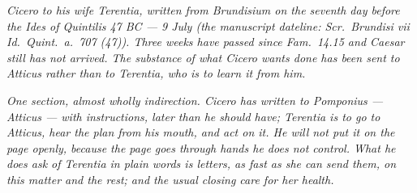 
\textit{Cicero to his wife Terentia, written from
Brundisium on the seventh day before the Ides of
Quintilis 47 BC --- 9 July (the manuscript dateline:
\textit{Scr.\ Brundisi vii Id.\ Quint.\ a.\ 707
(47)}). Three weeks have passed since Fam.\ 14.15 and
Caesar still has not arrived. The substance of what
Cicero wants done has been sent to Atticus rather than
to Terentia, who is to learn it from him.}

\textit{One section, almost wholly indirection. Cicero
has written to Pomponius --- Atticus --- with
instructions, later than he should have; Terentia is
to go to Atticus, hear the plan from his mouth, and
act on it. He will not put it on the page openly,
because the page goes through hands he does not
control. What he does ask of Terentia in plain words
is letters, as fast as she can send them, on this
matter and the rest; and the usual closing care for
her health.}
